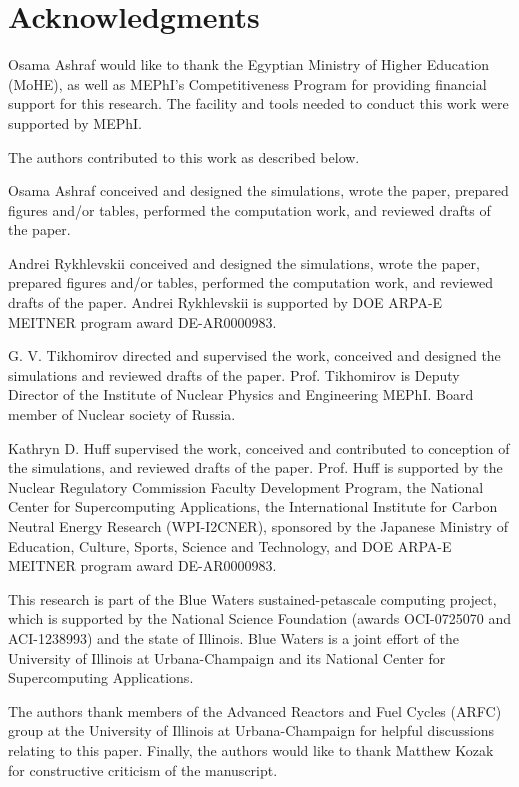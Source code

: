 \section{Acknowledgments}

Osama Ashraf would like to thank the Egyptian Ministry of Higher Education (MoHE), as well as MEPhI's Competitiveness Program for providing financial support for this research. The facility and tools needed to conduct this work were supported by MEPhI.

The authors contributed to this work as described below.

Osama Ashraf conceived and designed the simulations, wrote the paper, prepared figures 
and/or tables, performed the computation work, and reviewed drafts of the paper.

Andrei Rykhlevskii conceived and designed the simulations, wrote the paper, prepared figures 
and/or tables, performed the computation work, and reviewed drafts of the paper. Andrei Rykhlevskii 
is supported by  DOE ARPA-E MEITNER program award DE-AR0000983. 

G. V. Tikhomirov directed and supervised the work, conceived and designed the simulations and reviewed drafts of the paper. Prof. Tikhomirov is Deputy Director of the Institute of Nuclear Physics and Engineering MEPhI. Board member of Nuclear society of Russia.

Kathryn D. Huff supervised the work, conceived and contributed to conception of the simulations, and reviewed drafts of the paper.  Prof. Huff is supported by the Nuclear Regulatory Commission Faculty Development Program, the National Center for Supercomputing Applications, the International Institute for Carbon Neutral Energy Research (WPI-I2CNER), 
sponsored by the Japanese Ministry of Education, Culture, Sports, Science and Technology, and  DOE ARPA-E MEITNER program award DE-AR0000983.

This research is part of the Blue Waters sustained-petascale computing 
project, which is supported by the National Science Foundation (awards 
OCI-0725070 and ACI-1238993) and the state of Illinois. Blue Waters is a joint 
effort of the University of Illinois at Urbana-Champaign and its National 
Center for Supercomputing Applications.

The authors thank members of the Advanced Reactors and Fuel Cycles (ARFC) 
group at the University of Illinois at Urbana-Champaign for helpful 
discussions relating to this paper. Finally, the authors would like to thank 
Matthew Kozak for constructive criticism of the manuscript.
